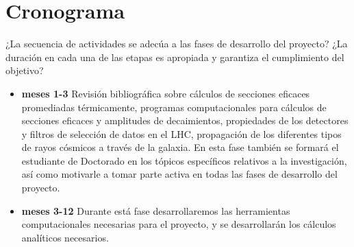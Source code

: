 \section{ Cronograma}
\begin{instrucciones}
  ¿La secuencia de actividades se adecúa a las fases de desarrollo del proyecto? ¿La duración en cada una de las etapas es apropiada y garantiza el cumplimiento del objetivo?
\end{instrucciones}


\begin{itemize}
\item \textbf{meses 1-3} Revisión bibliográfica sobre cálculos de
  secciones eficaces promediadas térmicamente, programas
  computacionales para cálculos de secciones eficaces y amplitudes de
  decaimientos, propiedades de los detectores y filtros de selección
  de datos en el LHC, propagación de los diferentes tipos de rayos
  cósmicos a través de la galaxia.  En esta fase también se formará el
  estudiante de Doctorado en los tópicos específicos relativos a la
  investigación, así como motivarle a tomar parte activa en todas las
  fases de desarrollo del proyecto.

\item \textbf{meses 3-12} Durante está fase desarrollaremos las
  herramientas computacionales necesarias para el proyecto, y se
  desarrollarán los cálculos analíticos necesarios.


\end{itemize}
